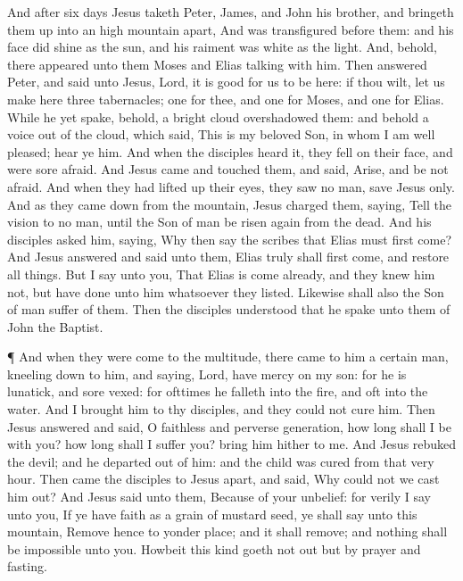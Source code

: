  And after six days Jesus taketh Peter, James, and John his
brother, and bringeth them up into an high mountain apart, 
And was transfigured before them: and his face did shine as the sun, and
his raiment was white as the light.  And, behold, there
appeared unto them Moses and Elias talking with him.  Then
answered Peter, and said unto Jesus, Lord, it is good for us to be here:
if thou wilt, let us make here three tabernacles; one for thee, and one
for Moses, and one for Elias.  While he yet spake, behold, a
bright cloud overshadowed them: and behold a voice out of the cloud,
which said, This is my beloved Son, in whom I am well pleased; hear ye
him.  And when the disciples heard it, they fell on their
face, and were sore afraid.  And Jesus came and touched
them, and said, Arise, and be not afraid.  And when they had
lifted up their eyes, they saw no man, save Jesus only.  And
as they came down from the mountain, Jesus charged them, saying, Tell
the vision to no man, until the Son of man be risen again from the dead.
 And his disciples asked him, saying, Why then say the
scribes that Elias must first come?  And Jesus answered and
said unto them, Elias truly shall first come, and restore all things.
 But I say unto you, That Elias is come already, and they
knew him not, but have done unto him whatsoever they listed. Likewise
shall also the Son of man suffer of them.  Then the
disciples understood that he spake unto them of John the Baptist.

 ¶ And when they were come to the multitude, there came to
him a certain man, kneeling down to him, and saying,  Lord,
have mercy on my son: for he is lunatick, and sore vexed: for ofttimes
he falleth into the fire, and oft into the water.  And I
brought him to thy disciples, and they could not cure him. 
Then Jesus answered and said, O faithless and perverse generation, how
long shall I be with you? how long shall I suffer you? bring him hither
to me.  And Jesus rebuked the devil; and he departed out of
him: and the child was cured from that very hour.  Then
came the disciples to Jesus apart, and said, Why could not we cast him
out?  And Jesus said unto them, Because of your unbelief:
for verily I say unto you, If ye have faith as a grain of mustard seed,
ye shall say unto this mountain, Remove hence to yonder place; and it
shall remove; and nothing shall be impossible unto you. 
Howbeit this kind goeth not out but by prayer and fasting.

